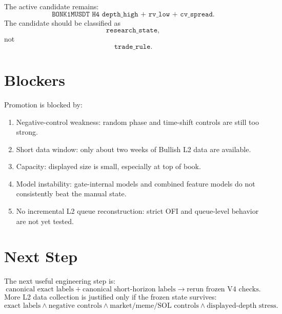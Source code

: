\documentclass[11pt]{article}
\begin{document}
The active candidate remains:
\[
  \texttt{BONK1MUSDT H4 depth\_high + rv\_low + cv\_spread}.
\]
The candidate should be classified as
\[
  \texttt{research\_state},
\]
not
\[
  \texttt{trade\_rule}.
\]

\section{Blockers}

Promotion is blocked by:
\begin{enumerate}
  \item Negative-control weakness: random phase and time-shift controls are still too strong.
  \item Short data window: only about two weeks of Bullish L2 data are available.
  \item Capacity: displayed size is small, especially at top of book.
  \item Model instability: gate-internal models and combined feature models do not consistently beat the manual state.
  \item No incremental L2 queue reconstruction: strict OFI and queue-level behavior are not yet tested.
\end{enumerate}

\section{Next Step}

The next useful engineering step is:
\[
  \text{canonical exact labels}
  +
  \text{canonical short-horizon labels}
  \rightarrow
  \text{rerun frozen V4 checks}.
\]
More L2 data collection is justified only if the frozen state survives:
\[
  \text{exact labels}
  \land
  \text{negative controls}
  \land
  \text{market/meme/SOL controls}
  \land
  \text{displayed-depth stress}.
\]
\end{document}
